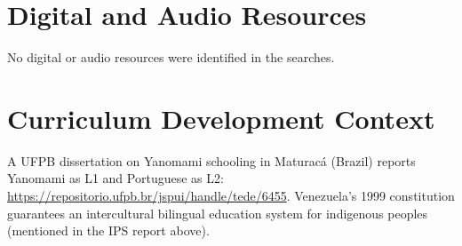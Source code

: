 \documentclass[12pt]{article}
\begin{document}
\section{Digital and Audio Resources}
No digital or audio resources were identified in the searches.

\section{Curriculum Development Context}
A UFPB dissertation on Yanomami schooling in Maturacá (Brazil) reports Yanomami as L1 and Portuguese as L2: \url{https://repositorio.ufpb.br/jspui/handle/tede/6455}. Venezuela's 1999 constitution guarantees an intercultural bilingual education system for indigenous peoples (mentioned in the IPS report above).
\end{document}
